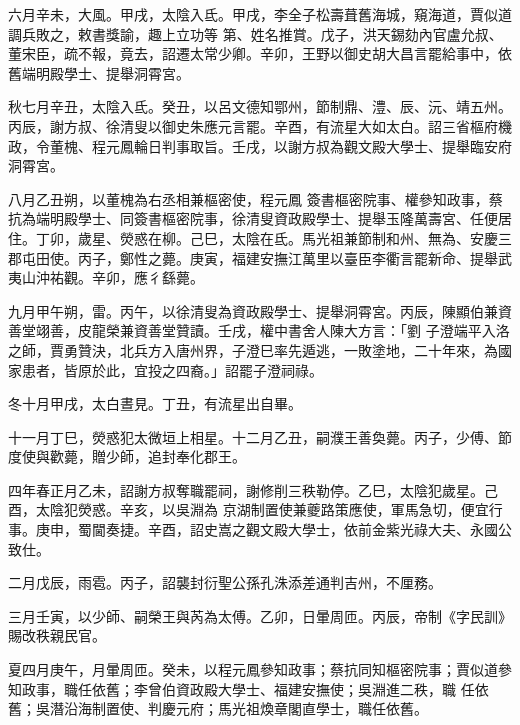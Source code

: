 \begin{pinyinscope}
 六月辛未，大風。甲戌，太陰入氐。甲戌，李全子松壽葺舊海城，窺海道，賈似道調兵敗之，敕書獎諭，趣上立功等
 第、姓名推賞。戊子，洪天錫劾內官盧允叔、董宋臣，疏不報，竟去，詔遷太常少卿。辛卯，王野以御史胡大昌言罷給事中，依舊端明殿學士、提舉洞霄宮。



 秋七月辛丑，太陰入氐。癸丑，以呂文德知鄂州，節制鼎、澧、辰、沅、靖五州。丙辰，謝方叔、徐清叟以御史朱應元言罷。辛酉，有流星大如太白。詔三省樞府機政，令董槐、程元鳳輪日判事取旨。壬戌，以謝方叔為觀文殿大學士、提舉臨安府洞霄宮。



 八月乙丑朔，以董槐為右丞相兼樞密使，程元鳳
 簽書樞密院事、權參知政事，蔡抗為端明殿學士、同簽書樞密院事，徐清叟資政殿學士、提舉玉隆萬壽宮、任便居住。丁卯，歲星、熒惑在柳。己巳，太陰在氐。馬光祖兼節制和州、無為、安慶三郡屯田使。丙子，鄭性之薨。庚寅，福建安撫江萬里以臺臣李衢言罷新命、提舉武夷山沖祐觀。辛卯，應彳繇薨。



 九月甲午朔，雷。丙午，以徐清叟為資政殿學士、提舉洞霄宮。丙辰，陳顯伯兼資善堂翊善，皮龍榮兼資善堂贊讀。壬戌，權中書舍人陳大方言：「劉
 子澄端平入洛之師，賈勇贊決，北兵方入唐州界，子澄巳率先遁逃，一敗塗地，二十年來，為國家患者，皆原於此，宜投之四裔。」詔罷子澄祠祿。



 冬十月甲戌，太白晝見。丁丑，有流星出自畢。



 十一月丁巳，熒惑犯太微垣上相星。十二月乙丑，嗣濮王善奐薨。丙子，少傅、節度使與歡薨，贈少師，追封奉化郡王。



 四年春正月乙未，詔謝方叔奪職罷祠，謝修削三秩勒停。乙巳，太陰犯歲星。己酉，太陰犯熒惑。辛亥，以吳淵為
 京湖制置使兼夔路策應使，軍馬急切，便宜行事。庚申，蜀閫奏捷。辛酉，詔史嵩之觀文殿大學士，依前金紫光祿大夫、永國公致仕。



 二月戊辰，雨雹。丙子，詔襲封衍聖公孫孔洙添差通判吉州，不厘務。



 三月壬寅，以少師、嗣榮王與芮為太傅。乙卯，日暈周匝。丙辰，帝制《字民訓》賜改秩親民官。



 夏四月庚午，月暈周匝。癸未，以程元鳳參知政事；蔡抗同知樞密院事；賈似道參知政事，職任依舊；李曾伯資政殿大學士、福建安撫使；吳淵進二秩，職
 任依舊；吳潛沿海制置使、判慶元府；馬光祖煥章閣直學士，職任依舊。




\end{pinyinscope}

